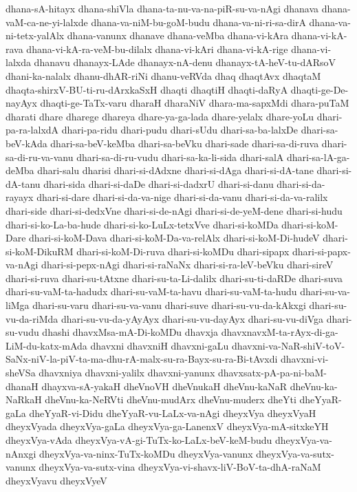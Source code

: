 {dhana-sA-hitayx
dhana-shiVla
dhana-ta-nu-va-na-piR-su-va-nAgi
dhanava
dhana-vaM-ca-ne-yi-lalxde
dhana-va-niM-bu-goM-budu
dhana-va-ni-ri-sa-dirA
dhana-va-ni-tetx-yalAlx
dhana-vanunx
dhanave
dhana-veMba
dhana-vi-kAra
dhana-vi-kA-rava
dhana-vi-kA-ra-veM-bu-dilalx
dhana-vi-kAri
dhana-vi-kA-rige
dhana-vi-lalxda
dhanavu
dhanayx-LAde
dhanayx-nA-denu
dhanayx-tA-heV-tu-dARsoV
dhani-ka-nalalx
dhanu-dhAR-riNi
dhanu-veRVda
dhaq
dhaqtAvx
dhaqtaM
dhaqta-shirxV-BU-ti-ru-dArxkaSxH
dhaqti
dhaqtiH
dhaqti-daRyA
dhaqti-ge-De-nayAyx
dhaqti-ge-TaTx-varu
dharaH
dharaNiV
dhara-ma-sapxMdi
dhara-puTaM
dharati
dhare
dharege
dhareya
dhare-ya-ga-lada
dhare-yelalx
dhare-yoLu
dhari-pa-ra-lalxdA
dhari-pa-ridu
dhari-pudu
dhari-sUdu
dhari-sa-ba-lalxDe
dhari-sa-beV-kAda
dhari-sa-beV-keMba
dhari-sa-beVku
dhari-sade
dhari-sa-di-ruva
dhari-sa-di-ru-va-vanu
dhari-sa-di-ru-vudu
dhari-sa-ka-li-sida
dhari-salA
dhari-sa-lA-ga-deMba
dhari-salu
dharisi
dhari-si-dAdxne
dhari-si-dAga
dhari-si-dA-tane
dhari-si-dA-tanu
dhari-sida
dhari-si-daDe
dhari-si-dadxrU
dhari-si-danu
dhari-si-da-rayayx
dhari-si-dare
dhari-si-da-va-nige
dhari-si-da-vanu
dhari-si-da-va-ralilx
dhari-side
dhari-si-dedxVne
dhari-si-de-nAgi
dhari-si-de-yeM-dene
dhari-si-hudu
dhari-si-ko-La-ba-hude
dhari-si-ko-LuLx-tetxVve
dhari-si-koMDa
dhari-si-koM-Dare
dhari-si-koM-Dava
dhari-si-koM-Da-va-relAlx
dhari-si-koM-Di-hudeV
dhari-si-koM-DikuRM
dhari-si-koM-Di-ruva
dhari-si-koMDu
dhari-sipapx
dhari-si-papx-va-nAgi
dhari-si-pepx-nAgi
dhari-si-raNaNx
dhari-si-ra-leV-beVku
dhari-sireV
dhari-si-ruva
dhari-su-tAtxne
dhari-su-ta-Li-dalilx
dhari-su-ti-daRDe
dhari-suva
dhari-su-vaM-ta-hadudx
dhari-su-vaM-ta-havu
dhari-su-vaM-ta-hudu
dhari-su-va-liMga
dhari-su-varu
dhari-su-va-vanu
dhari-suve
dhari-su-vu-da-kAkxgi
dhari-su-vu-da-riMda
dhari-su-vu-da-yAyAyx
dhari-su-vu-dayAyx
dhari-su-vu-diVga
dhari-su-vudu
dhashi
dhavxMsa-mA-Di-koMDu
dhavxja
dhavxnavxM-ta-rAyx-di-ga-LiM-du-katx-mAda
dhavxni
dhavxniH
dhavxni-gaLu
dhavxni-va-NaR-shiV-toV-SaNx-niV-la-piV-ta-ma-dhu-rA-malx-su-ra-Bayx-su-ra-Bi-tAvxdi
dhavxni-vi-sheVSa
dhavxniya
dhavxni-yalilx
dhavxni-yanunx
dhavxsatx-pA-pa-ni-baM-dhanaH
dhayxva-sA-yakaH
dheVnoVH
dheVnukaH
dheVnu-kaNaR
dheVnu-ka-NaRkaH
dheVnu-ka-NeRVti
dheVnu-mudArx
dheVnu-muderx
dheYti
dheYyaR-gaLa
dheYyaR-vi-Didu
dheYyaR-vu-LaLx-va-nAgi
dheyxVya
dheyxVyaH
dheyxVyada
dheyxVya-gaLa
dheyxVya-ga-LanenxV
dheyxVya-mA-sitxkeYH
dheyxVya-vAda
dheyxVya-vA-gi-TuTx-ko-LaLx-beV-keM-budu
dheyxVya-va-nAnxgi
dheyxVya-va-ninx-TuTx-koMDu
dheyxVya-vanunx
dheyxVya-va-sutx-vanunx
dheyxVya-va-sutx-vina
dheyxVya-vi-shavx-liV-BoV-ta-dhA-raNaM
dheyxVyavu
dheyxVyeV
}
